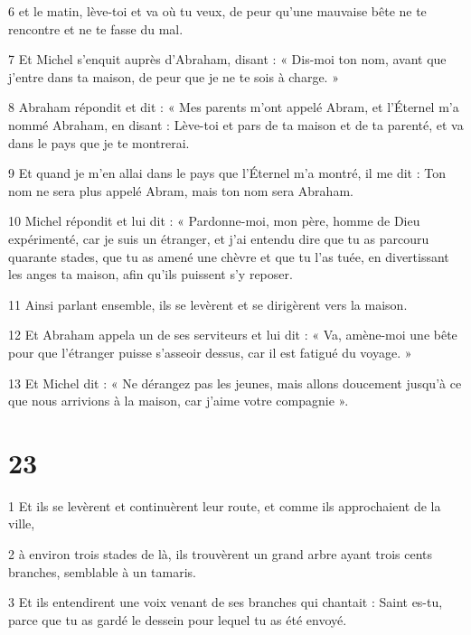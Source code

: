 \par 6 et le matin, lève-toi et va où tu veux, de peur qu'une mauvaise bête ne te rencontre et ne te fasse du mal.

\par 7 Et Michel s'enquit auprès d'Abraham, disant : « Dis-moi ton nom, avant que j'entre dans ta maison, de peur que je ne te sois à charge. »

\par 8 Abraham répondit et dit : « Mes parents m'ont appelé Abram, et l'Éternel m'a nommé Abraham, en disant : Lève-toi et pars de ta maison et de ta parenté, et va dans le pays que je te montrerai.

\par 9 Et quand je m'en allai dans le pays que l'Éternel m'a montré, il me dit : Ton nom ne sera plus appelé Abram, mais ton nom sera Abraham.

\par 10 Michel répondit et lui dit : « Pardonne-moi, mon père, homme de Dieu expérimenté, car je suis un étranger, et j'ai entendu dire que tu as parcouru quarante stades, que tu as amené une chèvre et que tu l'as tuée, en divertissant les anges ta maison, afin qu'ils puissent s'y reposer.

\par 11 Ainsi parlant ensemble, ils se levèrent et se dirigèrent vers la maison.

\par 12 Et Abraham appela un de ses serviteurs et lui dit : « Va, amène-moi une bête pour que l'étranger puisse s'asseoir dessus, car il est fatigué du voyage. »

\par 13 Et Michel dit : « Ne dérangez pas les jeunes, mais allons doucement jusqu'à ce que nous arrivions à la maison, car j'aime votre compagnie ».

\chapter{23}

\par 1 Et ils se levèrent et continuèrent leur route, et comme ils approchaient de la ville,

\par 2 à environ trois stades de là, ils trouvèrent un grand arbre ayant trois cents branches, semblable à un tamaris.

\par 3 Et ils entendirent une voix venant de ses branches qui chantait : Saint es-tu, parce que tu as gardé le dessein pour lequel tu as été envoyé.

